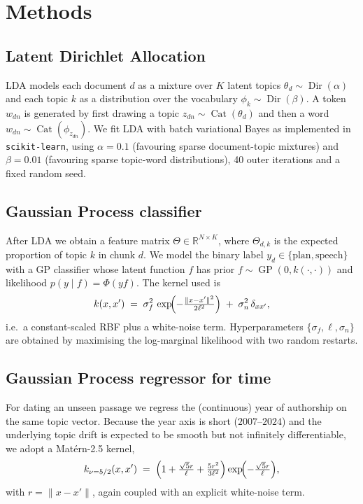 \documentclass[conference]{IEEEtran}
\begin{document}
\section{Methods}\label{sec:methods}

\subsection{Latent Dirichlet Allocation}
LDA models each document $d$ as a mixture over $K$ latent topics
$\theta_d \sim \operatorname{Dir}(\alpha)$ and each topic $k$ as a
distribution over the vocabulary
$\phi_k \sim \operatorname{Dir}(\beta)$.  A token $w_{dn}$ is generated
by first drawing a topic $z_{dn}\!\sim\!\operatorname{Cat}(\theta_d)$
and then a word $w_{dn}\!\sim\!\operatorname{Cat}(\phi_{z_{dn}})$.  We
fit LDA with batch variational Bayes as implemented in
\texttt{scikit-learn}, using $\alpha=0.1$ (favouring sparse
document-topic mixtures) and $\beta=0.01$ (favouring sparse
topic-word distributions), 40 outer iterations and a fixed random
seed.

\subsection{Gaussian Process classifier}
After LDA we obtain a feature matrix
$\Theta \in \mathbb{R}^{N\times K}$, where $\Theta_{d,k}$ is the
expected proportion of topic $k$ in chunk $d$.  We model the binary
label $y_d \in\{\text{plan},\text{speech}\}$ with a GP classifier
whose latent function $f$ has prior
$f \sim \operatorname{GP}(0, k(\cdot, \cdot))$ and likelihood
$p(y\!\mid\! f)=\Phi(yf)$.  The kernel used is
\begin{equation}
k(x,x') \;=\; \sigma_{f}^{2}\,
              \exp\!\Bigl(-\tfrac{\|x-x'\|^{2}}{2\ell^{2}}\Bigr)
              \;+\; \sigma_{n}^{2}\,\delta_{xx'},
\end{equation}
i.e.\ a constant-scaled RBF plus a white-noise term.  Hyperparameters
$\{\sigma_{f},\ell,\sigma_{n}\}$ are obtained by maximising the
log-marginal likelihood with two random restarts.

\subsection{Gaussian Process regressor for time}
For dating an unseen passage we regress the (continuous) year of
authorship on the same topic vector.  Because the year axis is short
($2007$--$2024$) and the underlying topic drift is expected to be
smooth but not infinitely differentiable, we adopt a Mat\'ern-2.5
kernel,
\begin{equation}
k_{\nu=5/2}(x,x') \;=\;
   \Bigl(1 + \tfrac{\sqrt{5}r}{\ell} + \tfrac{5r^{2}}{3\ell^{2}}\Bigr)
   \exp\!\Bigl(-\tfrac{\sqrt{5}r}{\ell}\Bigr),
\end{equation}
with $r=\|x-x'\|$, again coupled with an explicit white-noise term.
\end{document}
